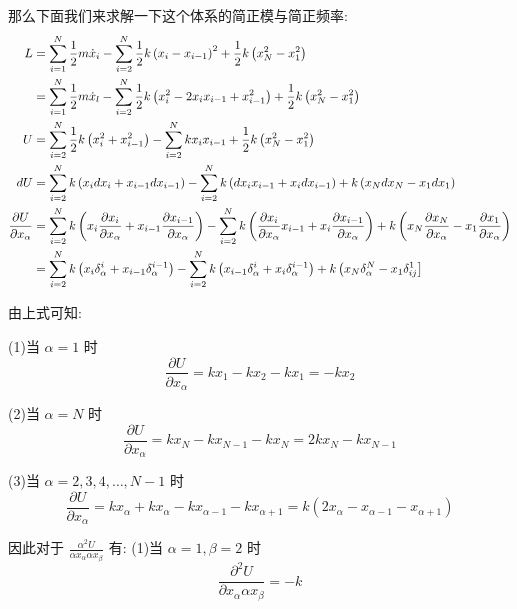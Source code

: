 \documentclass[11pt, a4paper, oneside]{ctexart}
\begin{document}
{{{\begin{appendices}
{    那么下面我们来求解一下这个体系的简正模与简正频率:
\begin{equation*}
        \normalsize{
        \begin{aligned}
        L&=\sum_{i=1}^{N} \frac{1}{2} m \dot{x}_{i}-\sum_{i=2}^{N} \frac{1}{2} k\left(x_{i}-x_{i-1}\right)^{2}+\frac{1}{2} k\left(x_{N}^{2}-x_{1}^{2}\right) \\
        &=\sum_{i=1}^{N} \frac{1}{2} m \dot{x}_{l}-\sum_{i=2}^{N} \frac{1}{2} k\left(x_{i}^{2}-2 x_{i} x_{i-1}+x_{i-1}^{2}\right)+\frac{1}{2} k\left(x_{N}^{2}-x_{1}^{2}\right) \\
        U&=\sum_{i=2}^{N} \frac{1}{2} k\left(x_{i}^{2}+x_{i-1}^{2}\right)-\sum_{i=2}^{N} k x_{i} x_{i-1}+\frac{1}{2} k\left(x_{N}^{2}-x_{1}^{2}\right) \\
        d U&=\sum_{i=2}^{N} k\left(x_{i} d x_{i}+x_{i-1} d x_{i-1}\right)-\sum_{i=2}^{N} k\left(d x_{i} x_{i-1}+x_{i} d x_{i-1}\right)+k\left(x_{N} d x_{N}-x_{1} d x_{1}\right) \\
        \frac{\partial U}{\partial x_{\alpha}}&=\sum_{i=2}^{N} k\left(x_{i} \frac{\partial x_{i}}{\partial x_{\alpha}}+x_{i-1} \frac{\partial x_{i-1}}{\partial x_{\alpha}}\right)-\sum_{i=2}^{N} k\left(\frac{\partial x_{i}}{\partial x_{\alpha}} x_{i-1}+x_{i} \frac{\partial x_{i-1}}{\partial x_{\alpha}}\right)+k\left(x_{N} \frac{\partial x_{N}}{\partial x_{\alpha}}-x_{1} \frac{\partial x_{1}}{\partial x_{\alpha}}\right) \\
        &=\sum_{i=2}^{N} k\left(x_{i} \delta_{\alpha}^{i}+x_{i-1} \delta_{\alpha}^{i-1}\right)-\sum_{i=2}^{N} k\left(x_{i-1} \delta_{\alpha}^{i}+x_{i} \delta_{\alpha}^{i-1}\right)+k\left(x_{N} \delta_{\alpha}^{N}-x_{1} \delta_{i j}^{1}\right]
        \end{aligned}}
        \end{equation*}

        由上式可知:

        (1)当 $\alpha=1$ 时
        $$
        \frac{\partial U}{\partial x_{\alpha}}=k x_{1}-k x_{2}-k x_{1}=-k x_{2}
        $$

        (2)当 $\alpha=N$ 时
        $$
        \frac{\partial U}{\partial x_{\alpha}}=k x_{N}-k x_{N-1}-k x_{N}=2 k x_{N}-k x_{N-1}
        $$

        (3)当 $\alpha=2,3,4, \ldots, N-1$ 时
        $$
        \frac{\partial U}{\partial x_{\alpha}}=k x_{\alpha}+k x_{\alpha}-k x_{\alpha-1}-k x_{\alpha+1}=k\left(2 x_{\alpha}-x_{\alpha-1}-x_{\alpha+1}\right)
        $$

因此对于 $\frac{\alpha^{2} U}{\alpha x_{\alpha} \alpha x_{\beta}}$ 有:
(1)当 $\alpha=1, \beta=2$ 时
$$
\frac{\partial^{2} U}{\partial x_{\alpha} \alpha x_{\beta}}=-k
$$

}
\end{appendices}}}}
\end{document}
